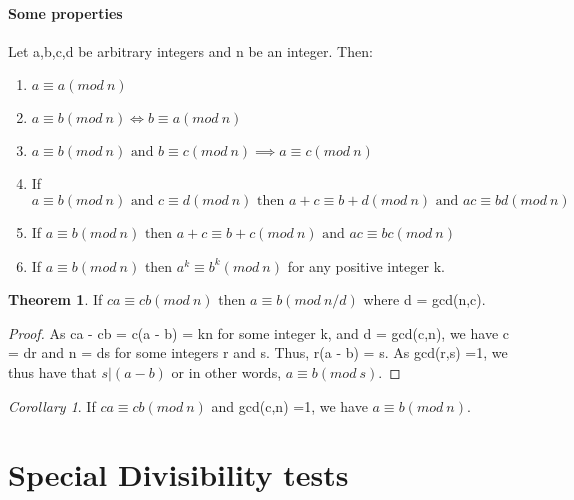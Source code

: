 \documentclass[15,a4paper]{report}
\theoremstyle{definition}
\newtheorem{theorem}{Theorem}[section]
\theoremstyle{remark}
\newtheorem{corollary}{Corollary}[theorem]
\begin{document}
        \paragraph{Some properties} Let a,b,c,d be arbitrary integers and n be an integer. Then:
            \begin{enumerate}
                \item $a\equiv a(mod ~n)$
                \item $a\equiv b(mod ~n) \iff b\equiv a(mod ~n)$
                \item $a\equiv b(mod ~n) \textrm{ and } b\equiv c(mod ~n) \implies a\equiv c(mod ~n) $
                \item  If $a\equiv b(mod ~n) \textrm{ and } c\equiv d(mod ~n) \textrm{ then } a+c\equiv b+d(mod ~n) \textrm{ and } ac\equiv bd(mod ~n)$
                \item If $a\equiv b(mod ~n) \textrm{ then } a+c\equiv b+c(mod ~n) \textrm{ and } ac\equiv bc(mod ~n)$ 
                \item If $a\equiv b(mod ~n)$ then $a^k\equiv b^k(mod ~n)$ for any positive integer k.
            \end{enumerate}
        \begin{theorem}
            If $ca\equiv cb(mod ~n)$ then $a\equiv b(mod ~n/d)$ where d = gcd(n,c).
        \end{theorem}  
            \begin{proof}
                As ca - cb = c(a - b) = kn for some integer k, and d = gcd(c,n), we have c = dr and n = ds for some integers r and s. Thus, r(a - b) = s. As gcd(r,s) =1, we thus have that $s|(a-b)$ or in other words, $a\equiv b(mod ~s)$.
            \end{proof}
            \begin{corollary}
                If $ca\equiv cb(mod ~n) $ and gcd(c,n) =1, we have $a\equiv b(mod ~n)$.
            \end{corollary}
    \section{Special Divisibility tests}
\end{document}
